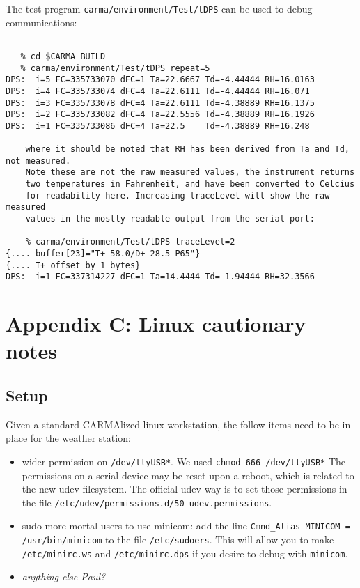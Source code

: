 \documentclass[11pt]{article}
\begin{document}
The test program {\tt carma/environment/Test/tDPS} can be used to debug
communications:

\footnotesize
\begin{verbatim}

   % cd $CARMA_BUILD
   % carma/environment/Test/tDPS repeat=5
DPS:  i=5 FC=335733070 dFC=1 Ta=22.6667 Td=-4.44444 RH=16.0163
DPS:  i=4 FC=335733074 dFC=4 Ta=22.6111 Td=-4.44444 RH=16.071
DPS:  i=3 FC=335733078 dFC=4 Ta=22.6111 Td=-4.38889 RH=16.1375
DPS:  i=2 FC=335733082 dFC=4 Ta=22.5556 Td=-4.38889 RH=16.1926
DPS:  i=1 FC=335733086 dFC=4 Ta=22.5    Td=-4.38889 RH=16.248

    where it should be noted that RH has been derived from Ta and Td, not measured.
    Note these are not the raw measured values, the instrument returns
    two temperatures in Fahrenheit, and have been converted to Celcius
    for readability here. Increasing traceLevel will show the raw measured
    values in the mostly readable output from the serial port:

    % carma/environment/Test/tDPS traceLevel=2
{.... buffer[23]="T+ 58.0/D+ 28.5 P65"}
{.... T+ offset by 1 bytes}
DPS:  i=1 FC=337314227 dFC=1 Ta=14.4444 Td=-1.94444 RH=32.3566

\end{verbatim}
\normalsize

\newpage
\section{Appendix C: Linux cautionary notes}

\subsection{Setup}

Given a standard CARMAlized linux workstation, the follow items need to be in place
for the weather station:

\begin{itemize}

\item wider permission on {\tt /dev/ttyUSB*}. We used {\tt chmod 666 /dev/ttyUSB*}
The permissions on a serial device may be reset upon a reboot, which is related
to the new udev filesystem.  The official udev way is to set those
permissions in the file {\tt /etc/udev/permissions.d/50-udev.permissions}.


\item sudo more mortal users to use minicom: 
add the line {\tt Cmnd\_Alias   MINICOM = /usr/bin/minicom}
to the file {\tt /etc/sudoers}. 
This will allow you to make {\tt /etc/minirc.ws} and
{\tt /etc/minirc.dps} if you desire to debug with {\tt minicom}.

\item {\it anything else Paul?}

\end{itemize}
\end{document}
